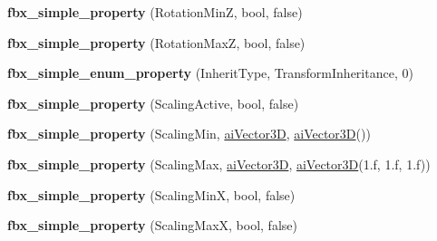 \begin{DoxyCompactItemize}
\item 
\hypertarget{class_assimp_1_1_f_b_x_1_1_model_a83c33032d9afbdf31870967f282f2d67}{{\bfseries fbx\+\_\+simple\+\_\+property} (Rotation\+Min\+Z, bool, false)}\label{class_assimp_1_1_f_b_x_1_1_model_a83c33032d9afbdf31870967f282f2d67}

\item 
\hypertarget{class_assimp_1_1_f_b_x_1_1_model_a98a2e5d08ffd7981f9dc8601e9e8002e}{{\bfseries fbx\+\_\+simple\+\_\+property} (Rotation\+Max\+Z, bool, false)}\label{class_assimp_1_1_f_b_x_1_1_model_a98a2e5d08ffd7981f9dc8601e9e8002e}

\item 
\hypertarget{class_assimp_1_1_f_b_x_1_1_model_a113e0b056989cd5ec190d9a253273e65}{{\bfseries fbx\+\_\+simple\+\_\+enum\+\_\+property} (Inherit\+Type, Transform\+Inheritance, 0)}\label{class_assimp_1_1_f_b_x_1_1_model_a113e0b056989cd5ec190d9a253273e65}

\item 
\hypertarget{class_assimp_1_1_f_b_x_1_1_model_a582f4bd409a6bf019c51494596411b97}{{\bfseries fbx\+\_\+simple\+\_\+property} (Scaling\+Active, bool, false)}\label{class_assimp_1_1_f_b_x_1_1_model_a582f4bd409a6bf019c51494596411b97}

\item 
\hypertarget{class_assimp_1_1_f_b_x_1_1_model_ad5116d513398741c68235f80974c6670}{{\bfseries fbx\+\_\+simple\+\_\+property} (Scaling\+Min, \hyperlink{structai_vector3_d}{ai\+Vector3\+D}, \hyperlink{structai_vector3_d}{ai\+Vector3\+D}())}\label{class_assimp_1_1_f_b_x_1_1_model_ad5116d513398741c68235f80974c6670}

\item 
\hypertarget{class_assimp_1_1_f_b_x_1_1_model_a730dfe3120b6544366f47956c35a7e84}{{\bfseries fbx\+\_\+simple\+\_\+property} (Scaling\+Max, \hyperlink{structai_vector3_d}{ai\+Vector3\+D}, \hyperlink{structai_vector3_d}{ai\+Vector3\+D}(1.f, 1.f, 1.f))}\label{class_assimp_1_1_f_b_x_1_1_model_a730dfe3120b6544366f47956c35a7e84}

\item 
\hypertarget{class_assimp_1_1_f_b_x_1_1_model_af70ebeb7724a3ff6ec76c3359d546b54}{{\bfseries fbx\+\_\+simple\+\_\+property} (Scaling\+Min\+X, bool, false)}\label{class_assimp_1_1_f_b_x_1_1_model_af70ebeb7724a3ff6ec76c3359d546b54}

\item 
\hypertarget{class_assimp_1_1_f_b_x_1_1_model_aef583dfc67c6a4b2d46a73055b9fe6b9}{{\bfseries fbx\+\_\+simple\+\_\+property} (Scaling\+Max\+X, bool, false)}\label{class_assimp_1_1_f_b_x_1_1_model_aef583dfc67c6a4b2d46a73055b9fe6b9}


\end{DoxyCompactItemize}
